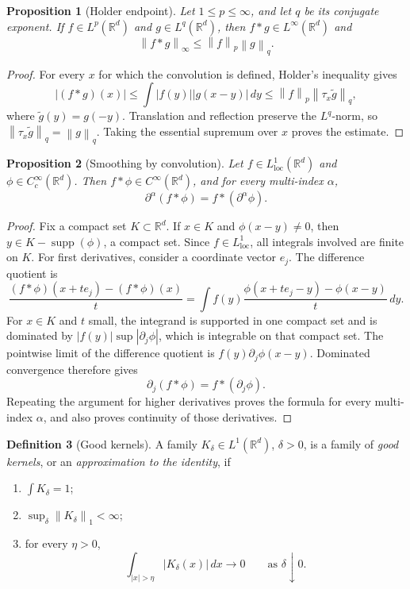 \documentclass[11pt,openany]{book}
\numberwithin{equation}{chapter}
\theoremstyle{definition}
\newtheorem{definition}{Definition}[chapter]
\theoremstyle{plain}
\newtheorem{proposition}[definition]{Proposition}
\theoremstyle{remark}
\newcommand{\R}{\mathbb{R}}
\newcommand{\1}{\mathbf{1}}
\newcommand{\dd}{\,d}
\newcommand{\abs}[1]{\left\lvert #1\right\rvert}
\newcommand{\norm}[1]{\left\lVert #1\right\rVert}
\newcommand{\supp}{\operatorname{supp}}
\newcommand{\loc}{\mathrm{loc}}
\begin{document}
\begin{proposition}[Holder endpoint]
Let \(1\le p\le\infty\), and let \(q\) be its conjugate exponent.  If \(f\in L^p(\R^d)\) and \(g\in L^q(\R^d)\), then \(f*g\in L^\infty(\R^d)\) and
\[
    \norm{f*g}_\infty\le \norm{f}_p\norm{g}_q.
\]
\end{proposition}

\begin{proof}
For every \(x\) for which the convolution is defined, Holder's inequality gives
\[
    \abs{(f*g)(x)}
    \le \int\abs{f(y)}\abs{g(x-y)}\dd y
    \le \norm{f}_p\norm{\tau_x\widetilde g}_q,
\]
where \(\widetilde g(y)=g(-y)\).  Translation and reflection preserve the \(L^q\)-norm, so \(\norm{\tau_x\widetilde g}_q=\norm{g}_q\).  Taking the essential supremum over \(x\) proves the estimate.
\end{proof}

\begin{proposition}[Smoothing by convolution]
Let \(f\in L^1_{\loc}(\R^d)\) and \(\phi\in C_c^\infty(\R^d)\). Then \(f*\phi\in C^\infty(\R^d)\), and for every multi-index \(\alpha\),
\[
    \partial^\alpha(f*\phi)=f*(\partial^\alpha\phi).
\]
\end{proposition}

\begin{proof}
Fix a compact set \(K\subset\R^d\).  If \(x\in K\) and \(\phi(x-y)\ne0\), then \(y\in K-\supp(\phi)\), a compact set.  Since \(f\in L^1_{\loc}\), all integrals involved are finite on \(K\).  For first derivatives, consider a coordinate vector \(e_j\).  The difference quotient is
\[
    \frac{(f*\phi)(x+te_j)-(f*\phi)(x)}{t}
    =\int f(y)\frac{\phi(x+te_j-y)-\phi(x-y)}{t}\dd y.
\]
For \(x\in K\) and \(t\) small, the integrand is supported in one compact set and is dominated by \(\abs{f(y)}\sup\abs{\partial_j\phi}\), which is integrable on that compact set.  The pointwise limit of the difference quotient is \(f(y)\partial_j\phi(x-y)\).  Dominated convergence therefore gives
\[
    \partial_j(f*\phi)=f*(\partial_j\phi).
\]
Repeating the argument for higher derivatives proves the formula for every multi-index \(\alpha\), and also proves continuity of those derivatives.
\end{proof}

\begin{definition}[Good kernels]
A family \(K_\delta\in L^1(\R^d)\), \(\delta>0\), is a family of \emph{good kernels}, or an \emph{approximation to the identity}, if
\begin{enumerate}[label=(\roman*)]
    \item \(\int K_\delta=1\);
    \item \(\sup_\delta\norm{K_\delta}_1<\infty\);
    \item for every \(\eta>0\),
    \[
        \int_{\abs{x}>\eta}\abs{K_\delta(x)}\dd x\to0
        \qquad\text{as }\delta\downarrow0.
    \]
\end{enumerate}
\end{definition}
\end{document}
